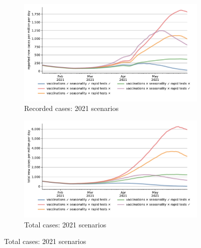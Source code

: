 \documentclass[12pt]{article}
\begin{document}
\begin{figure}[!tp]
    \centering

    \begin{subfigure}[b]{0.475\textwidth}
        \centering
        \includegraphics[width=\textwidth]{../figures/results/figures/scenario_comparisons/effect_of_channels_on_pessimistic_scenario/full_new_known_case}
        \caption{{Recorded cases: 2021 scenarios}}
        \label{fig:2021_scenarios_recorded}
    \end{subfigure}
    \hfill
    \begin{subfigure}[b]{0.475\textwidth}
        \centering
        \includegraphics[width=\textwidth]{../figures/results/figures/scenario_comparisons/effect_of_channels_on_pessimistic_scenario/full_newly_infected}
        \caption{{Total cases: 2021 scenarios}}
        \label{fig:2021_scenarios_newly_infected}
    \end{subfigure}


\end{figure}
\end{document}
